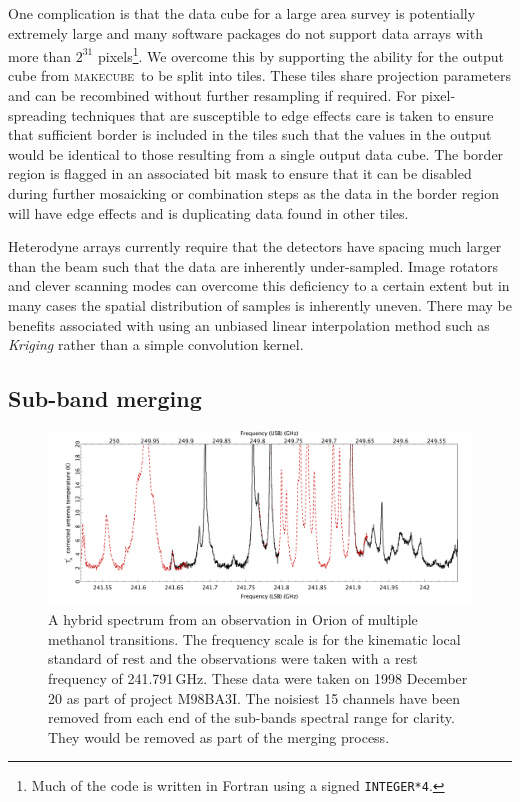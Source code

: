 \documentclass[a4paper,fleqn,usenatbib]{mnras}
\newcommand{\makecube}{\textsc{makecube}}
\begin{document}
One complication is that the data cube for a large area survey is
potentially extremely large and many software packages do not support
data arrays with more than $2^{31}$ pixels\footnote{Much of the code
is written in Fortran using a signed \texttt{INTEGER*4}.}. We overcome
this by supporting the ability for the output cube from \makecube\ to
be split into tiles. These tiles share projection parameters and can
be recombined without further resampling if required. For
pixel-spreading techniques that are susceptible to edge effects care is
taken to ensure that sufficient border is included in the tiles such
that the values in the output would be identical to those resulting
from a single output data cube. The border region is flagged in an
associated bit mask to ensure that it can be disabled during further
mosaicking or combination steps as the data in the border region will
have edge effects and is duplicating data found in other tiles.

Heterodyne arrays currently require that the detectors have spacing
much larger than the beam such that the data are inherently
under-sampled. Image rotators and clever scanning modes can overcome
this deficiency to a certain extent but in many cases the spatial
distribution of samples is inherently uneven. There may be benefits
associated with using an unbiased linear interpolation method such as
\emph{Kriging} \citep[e.g.,][]{1990Cressie} rather than a simple
convolution kernel.

\subsection{Sub-band merging}

\begin{figure}
\includegraphics[width=\textwidth]{hybrid}
\caption{A hybrid spectrum from an observation in Orion of multiple
  methanol transitions. The frequency scale is for the kinematic local
  standard of rest and the observations were taken with a rest
  frequency of 241.791\,GHz. These data were taken on 1998 December 20
  as part of project M98BA3I. The noisiest 15 channels have been
  removed from each end of the sub-bands spectral range for
  clarity. They would be removed as part of the merging process.}
\label{fig:hybrid}
\end{figure}
\end{document}
